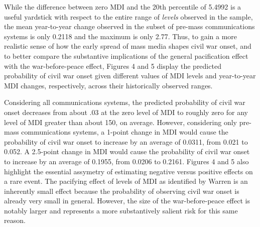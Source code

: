\documentclass[11pt,article,oneside]{memoir}
\begin{document}
\begin{table}[!htbp]
\end{table}

While the difference between zero MDI and the 20th percentile of 5.4992
is a useful yardstick with respect to the entire range of \emph{levels}
observed in the sample, the mean year-to-year change observed in the
subset of pre-mass communications systems is only 0.2118 and the maximum
is only 2.77. Thus, to gain a more realistic sense of how the early
spread of mass media shapes civil war onset, and to better compare the
substantive implications of the general pacification effect with the
war-before-peace effect, Figures 4 and 5 display the predicted
probability of civil war onset given different values of MDI levels and
year-to-year MDI changes, respectively, across their historically
observed ranges.

Considering all communications systems, the predicted probability of
civil war onset decreases from about .03 at the zero level of MDI to
roughly zero for any level of MDI greater than about 150, on average.
However, considering only pre-mass communications systems, a 1-point
change in MDI would cause the probability of civil war onset to increase
by an average of 0.0311, from 0.021 to 0.052. A 2.5-point change in MDI
would cause the probability of civil war onset to increase by an average
of 0.1955, from 0.0206 to 0.2161. Figures 4 and 5 also highlight the
essential assymetry of estimating negative versus positive effects on a
rare event. The pacifying effect of levels of MDI as identified by
Warren is an inherently small effect because the probability of
observing civil war onset is already very small in general. However, the
size of the war-before-peace effect is notably larger and represents a
more substantively salient risk for this same reason.
\end{document}
